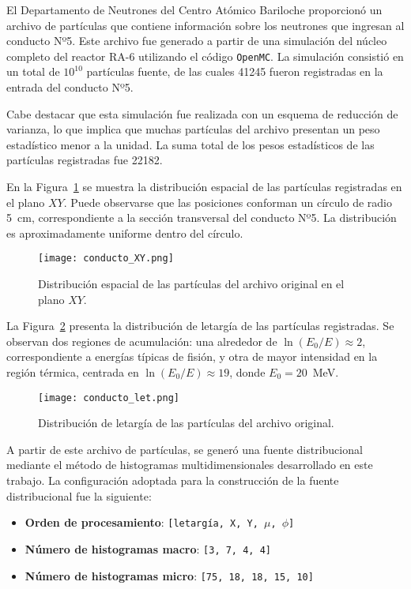 El Departamento de Neutrones del Centro Atómico Bariloche proporcionó un archivo de partículas que contiene información sobre los neutrones que ingresan al conducto Nº5. Este archivo fue generado a partir de una simulación del núcleo completo del reactor RA-6 utilizando el código \texttt{OpenMC}. La simulación consistió en un total de $10^{10}$ partículas fuente, de las cuales 41245 fueron registradas en la entrada del conducto Nº5.

Cabe destacar que esta simulación fue realizada con un esquema de reducción de varianza, lo que implica que muchas partículas del archivo presentan un peso estadístico menor a la unidad. La suma total de los pesos estadísticos de las partículas registradas fue 22182.

En la Figura~\ref{fig:conducto-XY} se muestra la distribución espacial de las partículas registradas en el plano $XY$. Puede observarse que las posiciones conforman un círculo de radio 5~cm, correspondiente a la sección transversal del conducto Nº5. La distribución es aproximadamente uniforme dentro del círculo.

\begin{figure}[h]
\centering
\texttt{[image: conducto\_XY.png]}
\caption{Distribución espacial de las partículas del archivo original en el plano $XY$.}
\label{fig:conducto-XY}
\end{figure}

La Figura~\ref{fig:conducto-let} presenta la distribución de letargía de las partículas registradas. Se observan dos regiones de acumulación: una alrededor de $\ln(E_0/E) \approx 2$, correspondiente a energías típicas de fisión, y otra de mayor intensidad en la región térmica, centrada en $\ln(E_0/E) \approx 19$, donde $E_0 = 20$~MeV.

\begin{figure}[h]
\centering
\texttt{[image: conducto\_let.png]}
\caption{Distribución de letargía de las partículas del archivo original.}
\label{fig:conducto-let}
\end{figure}

A partir de este archivo de partículas, se generó una fuente distribucional mediante el método de histogramas multidimensionales desarrollado en este trabajo. La configuración adoptada para la construcción de la fuente distribucional fue la siguiente:

\begin{itemize}
\item \textbf{Orden de procesamiento}: \texttt{[letargía, X, Y, $\mu$, $\phi$]}
\item \textbf{Número de histogramas macro}: \texttt{[3, 7, 4, 4]}
\item \textbf{Número de histogramas micro}: \texttt{[75, 18, 18, 15, 10]}
\end{itemize}

